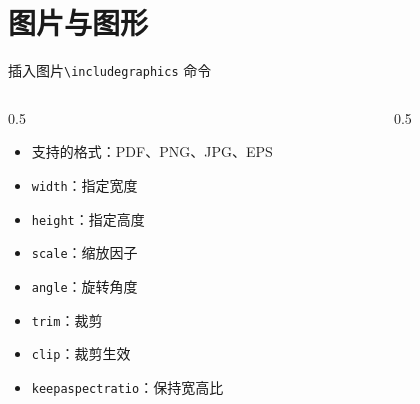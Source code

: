 \documentclass[UTF8,11pt,aspectratio=169]{beamer}
\begin{document}
\section{图片与图形}

\begin{frame}[fragile]{插入图片}{\texttt{\textbackslash includegraphics} 命令}
    \begin{columns}[T]
        \begin{column}{0.5\textwidth}
            \begin{itemize}
                \item 支持的格式：PDF、PNG、JPG、EPS
                \item \verb|width|：指定宽度
                \item \verb|height|：指定高度
                \item \verb|scale|：缩放因子
                \item \verb|angle|：旋转角度
                \item \verb|trim|：裁剪
                \item \verb|clip|：裁剪生效
                \item \verb|keepaspectratio|：保持宽高比
            \end{itemize}
        \end{column}
        \begin{column}{0.5\textwidth}
            \centering
        \end{column}
    \end{columns}
\end{frame}
\end{document}
